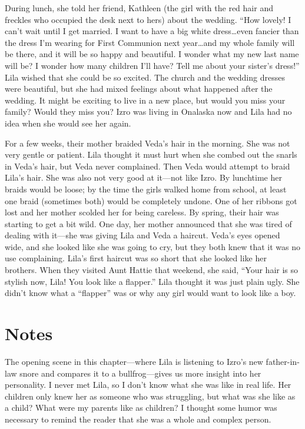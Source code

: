 \documentclass[
  american,
  letterpaper,
]{book}
\begin{document}
During lunch, she told her friend, Kathleen (the girl with the red hair
and freckles who occupied the desk next to hers) about the wedding.
``How lovely! I can't wait until I get married. I want to have a big
white dress\ldots even fancier than the dress I'm wearing for First
Communion next year\ldots and my whole family will be there, and it will
be so happy and beautiful. I wonder what my new last name will be? I
wonder how many children I'll have? Tell me about your sister's dress!''
Lila wished that she could be so excited. The church and the wedding
dresses were beautiful, but she had mixed feelings about what happened
after the wedding. It might be exciting to live in a new place, but
would you miss your family? Would they miss you? Izro was living in
Onalaska now and Lila had no idea when she would see her again.

For a few weeks, their mother braided Veda's hair in the morning. She
was not very gentle or patient. Lila thought it must hurt when she
combed out the snarls in Veda's hair, but Veda never complained. Then
Veda would attempt to braid Lila's hair. She was also not very good at
it---not like Izro. By lunchtime her braids would be loose; by the time
the girls walked home from school, at least one braid (sometimes both)
would be completely undone. One of her ribbons got lost and her mother
scolded her for being careless. By spring, their hair was starting to
get a bit wild. One day, her mother announced that she was tired of
dealing with it---she was giving Lila and Veda a haircut. Veda's eyes
opened wide, and she looked like she was going to cry, but they both
knew that it was no use complaining. Lila's first haircut was so short
that she looked like her brothers. When they visited Aunt Hattie that
weekend, she said, ``Your hair is so stylish now, Lila! You look like a
flapper.'' Lila thought it was just plain ugly. She didn't know what a
``flapper'' was or why any girl would want to look like a boy.

\section{Notes}\label{notes-7}

The opening scene in this chapter---where Lila is listening to Izro's
new father-in-law snore and compares it to a bullfrog---gives us more
insight into her personality. I never met Lila, so I don't know what she
was like in real life. Her children only knew her as someone who was
struggling, but what was she like as a child? What were my parents like
as children? I thought some humor was necessary to remind the reader
that she was a whole and complex person.
\end{document}
